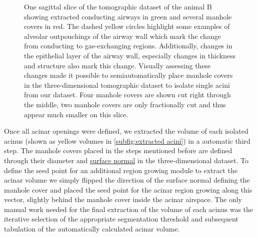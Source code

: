 \documentclass[%
	twoside,
	paper=a4,%
	abstract=true,%
	]{scrartcl}
\newlength\imagescale		%
\begin{document}
\begin{figure}
%
	\caption{One sagittal slice of the tomographic dataset of the animal B showing extracted conducting airways in green and several manhole covers in red. The dashed yellow circles highlight some examples of alveolar outpouchings of the airway wall which mark the change from conducting to gas-exchanging regions. Additionally, changes in the epithelial layer of the airway wall, especially changes in thickness and structure also mark this change. Visually assessing these changes made it possible to semiautomatically place manhole covers in the three-dimensional tomographic dataset to isolate single acini from our dataset. Four manhole covers are shown cut right through the middle, two manhole covers are only fractionally cut and thus appear much smaller on this slice.}
	\label{fig:ManholeCoverExplanation}
\end{figure}

Once all acinar openings were defined, we extracted the volume of each isolated acinus (shown as yellow volumes in \autoref{subfig:extracted acini}) in a automatic third step. The manhole covers placed in the steps mentioned before are defined through their diameter and \href{https://secure.wikimedia.org/wikipedia/en/w/index.php?title=Surface_normal&oldid=411684319}{surface normal} in the three-dimensional dataset. To define the seed point for an additional region growing module to extract the acinar volume we simply flipped the direction of the surface normal defining the manhole cover and placed the seed point for the acinar region growing along this vector, slightly behind the manhole cover inside the acinar airspace. The only manual work needed for the final extraction of the volume of each acinus was the iterative selection of the appropriate segmentation threshold and subsequent tabulation of the automatically calculated acinar volume.
\end{document}
